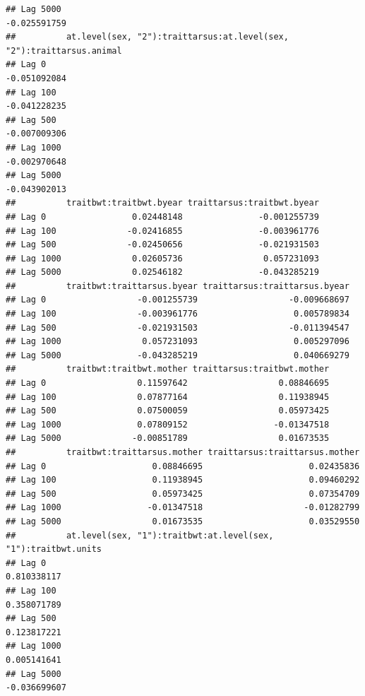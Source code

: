 \documentclass[
  12pt,
]{book}
\begin{document}
\begin{verbatim}
## Lag 5000                                                      -0.025591759
##          at.level(sex, "2"):traittarsus:at.level(sex, "2"):traittarsus.animal
## Lag 0                                                            -0.051092084
## Lag 100                                                          -0.041228235
## Lag 500                                                          -0.007009306
## Lag 1000                                                         -0.002970648
## Lag 5000                                                         -0.043902013
##          traitbwt:traitbwt.byear traittarsus:traitbwt.byear
## Lag 0                 0.02448148               -0.001255739
## Lag 100              -0.02416855               -0.003961776
## Lag 500              -0.02450656               -0.021931503
## Lag 1000              0.02605736                0.057231093
## Lag 5000              0.02546182               -0.043285219
##          traitbwt:traittarsus.byear traittarsus:traittarsus.byear
## Lag 0                  -0.001255739                  -0.009668697
## Lag 100                -0.003961776                   0.005789834
## Lag 500                -0.021931503                  -0.011394547
## Lag 1000                0.057231093                   0.005297096
## Lag 5000               -0.043285219                   0.040669279
##          traitbwt:traitbwt.mother traittarsus:traitbwt.mother
## Lag 0                  0.11597642                  0.08846695
## Lag 100                0.07877164                  0.11938945
## Lag 500                0.07500059                  0.05973425
## Lag 1000               0.07809152                 -0.01347518
## Lag 5000              -0.00851789                  0.01673535
##          traitbwt:traittarsus.mother traittarsus:traittarsus.mother
## Lag 0                     0.08846695                     0.02435836
## Lag 100                   0.11938945                     0.09460292
## Lag 500                   0.05973425                     0.07354709
## Lag 1000                 -0.01347518                    -0.01282799
## Lag 5000                  0.01673535                     0.03529550
##          at.level(sex, "1"):traitbwt:at.level(sex, "1"):traitbwt.units
## Lag 0                                                      0.810338117
## Lag 100                                                    0.358071789
## Lag 500                                                    0.123817221
## Lag 1000                                                   0.005141641
## Lag 5000                                                  -0.036699607

\end{verbatim}
\end{document}
